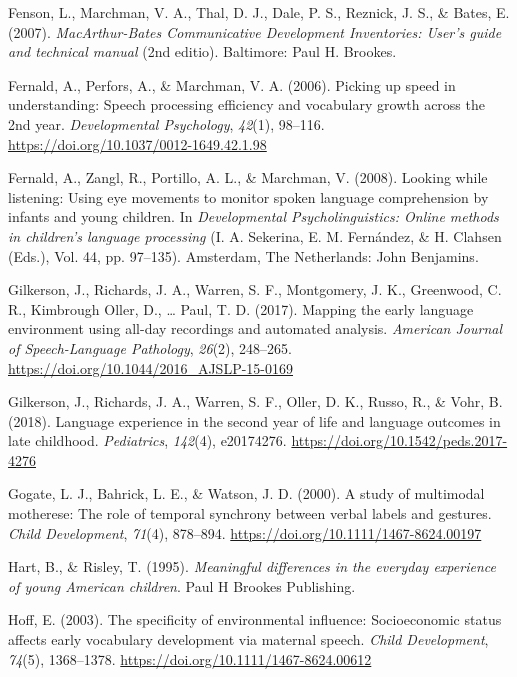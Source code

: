 \documentclass[
  english,
  man,floatsintext]{apa6}
\begin{document}
\leavevmode\hypertarget{ref-fenson_macarthur-bates_2007}{}%
Fenson, L., Marchman, V. A., Thal, D. J., Dale, P. S., Reznick, J. S., \& Bates, E. (2007). \emph{MacArthur-Bates Communicative Development Inventories: User's guide and technical manual} (2nd editio). Baltimore: Paul H. Brookes.

\leavevmode\hypertarget{ref-fernald_picking_2006}{}%
Fernald, A., Perfors, A., \& Marchman, V. A. (2006). Picking up speed in understanding: Speech processing efficiency and vocabulary growth across the 2nd year. \emph{Developmental Psychology}, \emph{42}(1), 98--116. \url{https://doi.org/10.1037/0012-1649.42.1.98}

\leavevmode\hypertarget{ref-fernald_looking_2008}{}%
Fernald, A., Zangl, R., Portillo, A. L., \& Marchman, V. (2008). Looking while listening: Using eye movements to monitor spoken language comprehension by infants and young children. In \emph{Developmental Psycholinguistics: Online methods in children's language processing} (I. A. Sekerina, E. M. Fernández, \& H. Clahsen (Eds.), Vol. 44, pp. 97--135). Amsterdam, The Netherlands: John Benjamins.

\leavevmode\hypertarget{ref-gilkerson_mapping_2017}{}%
Gilkerson, J., Richards, J. A., Warren, S. F., Montgomery, J. K., Greenwood, C. R., Kimbrough Oller, D., \ldots{} Paul, T. D. (2017). Mapping the early language environment using all-day recordings and automated analysis. \emph{American Journal of Speech-Language Pathology}, \emph{26}(2), 248--265. \url{https://doi.org/10.1044/2016_AJSLP-15-0169}

\leavevmode\hypertarget{ref-gilkerson_language_2018}{}%
Gilkerson, J., Richards, J. A., Warren, S. F., Oller, D. K., Russo, R., \& Vohr, B. (2018). Language experience in the second year of life and language outcomes in late childhood. \emph{Pediatrics}, \emph{142}(4), e20174276. \url{https://doi.org/10.1542/peds.2017-4276}

\leavevmode\hypertarget{ref-gogate_study_2000}{}%
Gogate, L. J., Bahrick, L. E., \& Watson, J. D. (2000). A study of multimodal motherese: The role of temporal synchrony between verbal labels and gestures. \emph{Child Development}, \emph{71}(4), 878--894. \url{https://doi.org/10.1111/1467-8624.00197}

\leavevmode\hypertarget{ref-hart_meaningful_1995}{}%
Hart, B., \& Risley, T. (1995). \emph{Meaningful differences in the everyday experience of young American children}. Paul H Brookes Publishing.

\leavevmode\hypertarget{ref-hoff_specificity_2003}{}%
Hoff, E. (2003). The specificity of environmental influence: Socioeconomic status affects early vocabulary development via maternal speech. \emph{Child Development}, \emph{74}(5), 1368--1378. \url{https://doi.org/10.1111/1467-8624.00612}
\end{document}
